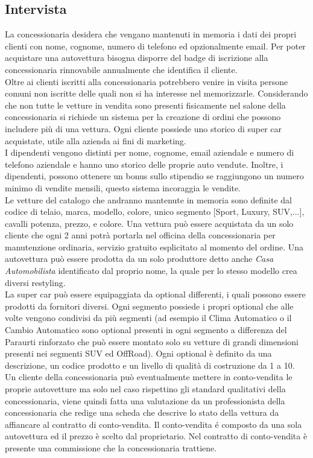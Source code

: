 \documentclass[11pt]{article}
\begin{document}
\subsection{Intervista}
La concessionaria desidera che vengano mantenuti in memoria i dati dei propri
clienti con nome, cognome, numero di telefono ed opzionalmente email. Per poter
acquistare una autovettura bisogna disporre del badge di iscrizione alla
concessionaria rinnovabile annualmente che identifica il cliente.\\
Oltre ai clienti iscritti alla concessionaria potrebbero venire in visita
persone comuni non iscritte delle quali non si ha interesse nel memorizzarle.
Considerando che non tutte le vetture in vendita sono presenti fisicamente nel
salone della concessionaria si richiede un sistema per la creazione di ordini
che possono includere più di una vettura. Ogni cliente possiede uno storico di
super car acquistate, utile alla azienda ai fini di marketing.\\
I dipendenti vengono distinti per nome, cognome, email aziendale e numero di
telefono aziendale e hanno uno storico delle proprie auto vendute. Inoltre, i
dipendenti, possono ottenere un bonus sullo stipendio se raggiungono un numero
minimo di vendite mensili, questo sistema incoraggia le vendite.\\
Le vetture del catalogo che andranno mantenute in memoria sono definite dal
codice di telaio, marca, modello, colore, unico segmento [Sport, Luxury,
SUV,...], cavalli potenza, prezzo, e colore. Una vettura può essere acquistata
da un solo cliente che ogni 2 anni potrà portarla nel officina della
concessionaria per manutenzione ordinaria, servizio gratuito esplicitato al
momento del ordine. Una autovettura può essere prodotta da un solo produttore
detto anche \textit{Casa Automobilista} identificato dal proprio nome, la quale
per lo stesso modello crea diversi restyling.\\
La super car può essere equipaggiata da optional differenti, i quali possono
essere prodotti da fornitori diversi. Ogni segmento possiede i propri optional
che alle volte vengono condivisi da più segmenti (ad esempio il Clima Automatico
o il Cambio Automatico sono optional presenti in ogni segmento a differenza del
Paraurti rinforzato che può essere montato solo su vetture di grandi dimensioni
presenti nei segmenti SUV ed OffRoad). Ogni optional è definito da una
descrizione, un codice prodotto e un livello di qualità di costruzione da 1 a
10.\\
Un cliente della concessionaria può eventualmente mettere in conto-vendita le
proprie autovetture ma solo nel caso rispettino gli standard qualitativi della
concessionaria, viene quindi fatta una valutazione da un professionista della
concessionaria che redige una scheda che descrive lo stato della vettura da
affiancare al contratto di conto-vendita. Il conto-vendita é composto da una
sola autovettura ed il prezzo è scelto dal proprietario. Nel contratto di
conto-vendita è presente una commissione che la concessionaria trattiene.
\end{document}
